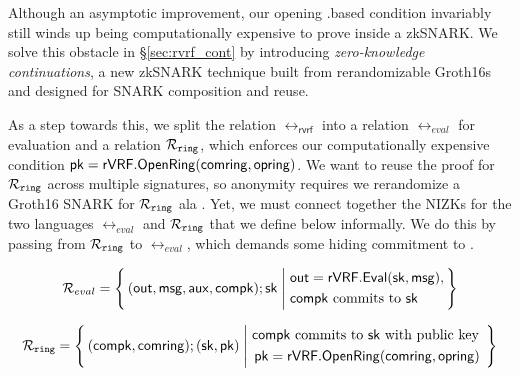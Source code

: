 


Although an asymptotic improvement, our opening \rVRF.\OpenRing based condition invariably
still winds up being computationally expensive to prove inside a zkSNARK.
We solve this obstacle in \S\ref{sec:rvrf_cont}  by introducing
{\em zero-knowledge continuations}, a new zkSNARK technique built from
rerandomizable Groth16s \cite{Groth16} and designed for SNARK composition and reuse.

As a step towards this, we split the relation $ \rel_{\mathsf{rvrf}} $ into a relation
$ \rel_{eval} $ for \rVRF evaluation and a relation $ \mathcal{R}_{\mathtt{ring}} $, which enforces our
computationally expensive condition $\mathsf{pk} = {\mathsf{rVRF}}.{\mathsf{OpenRing}}(\mathsf{comring},\mathsf{opring})$.
We want to reuse the proof for $ \mathcal{R}_{\mathtt{ring}} $ across multiple \rVRF signatures, so anonymity
requires we rerandomize a Groth16 SNARK for $ \mathcal{R}_{\mathtt{ring}} $
ala \cite[Theorem 3, Appendix C, pp. 31]{RandomizationGroth16}.
%
Yet, we must connect together the NIZKs for the two languages  $ \rel_{eval} $ and $ \mathcal{R}_{\mathtt{ring}}  $ that we define below informally. We do this by passing \pk from $ \mathcal{R}_{\mathtt{ring}}  $ to $ \rel_{eval} $, which
demands some hiding commitment \compk to \pk.

%
\def\tmpAA{\Out = \rVRF.\Eval(\sk,\msg)}%
\def\tmpBB{\textrm{\compk commits to\ \sk}}%
$$ \rel_{eval} = \Setst{ (\Out, \msg, \aux, \compk); \sk}{
	\eprint{
		\tmpAA, \, \tmpBB
	}{
		\begin{aligned}
			&\tmpAA, \\
			&\tmpBB \\
		\end{aligned}
	}
} $$

\def\tmpAA{\textrm{\compk commits to $ \sk $ with public key\ }}%
\def\tmpBB{\rVRF.\OpenRing(\comring,\openring)}%
$$ \Rring = \Setst{ (\compk, \comring);(\sk,\pk) }{
	\eprint{
		\tmpAA \pk = \tmpBB
	}{
		\begin{aligned}
			&\tmpAA \\
			&\, \pk = \tmpBB \\
		\end{aligned}
	}
} $$

